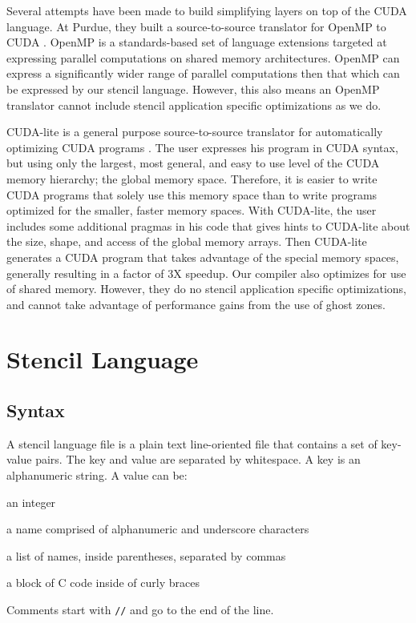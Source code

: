 \documentclass{styles/sig-alternate}
\begin{document}
Several attempts have been made to build simplifying layers on top of
the CUDA language.  At Purdue, they built a source-to-source
translator for OpenMP to CUDA \cite{openmp}.  OpenMP is a
standards-based set of language extensions targeted at expressing
parallel computations on shared memory architectures.  OpenMP can
express a significantly wider range of parallel computations then that
which can be expressed by our stencil language.  However, this also
means an OpenMP translator cannot include stencil application specific
optimizations as we do.

CUDA-lite is a general purpose source-to-source translator for
automatically optimizing CUDA programs \cite{cudalite}. The user
expresses his program in CUDA syntax, but using only the largest, 
most general, and easy to use level of the CUDA memory hierarchy; the global
memory space.  Therefore, it is easier to write CUDA programs that solely use
this memory space than to write programs optimized for the
smaller, faster memory spaces.  With CUDA-lite, the user includes some
additional pragmas in his code that gives hints to CUDA-lite about the
size, shape, and access of the global memory arrays.  Then CUDA-lite
generates a CUDA program that takes advantage of the special memory
spaces, generally resulting in a factor of 3X speedup.  Our compiler
also optimizes for use of shared memory.
However, they do no stencil application specific optimizations, and cannot 
take advantage of performance gains from the use of ghost zones.

\section{Stencil Language}

\subsection{Syntax}

A stencil language file is a plain text line-oriented file that
contains a set of key-value pairs.  The key and value are separated by
whitespace.  A key is an alphanumeric string.  A value can be:
\begin{itemize*}
\item an integer
\item a name comprised of alphanumeric and underscore characters
\item a list of names, inside parentheses, separated by commas
\item a block of C code inside of curly braces
\end{itemize*}
Comments start with {\tt //} and go to the end of the line.
\end{document}
